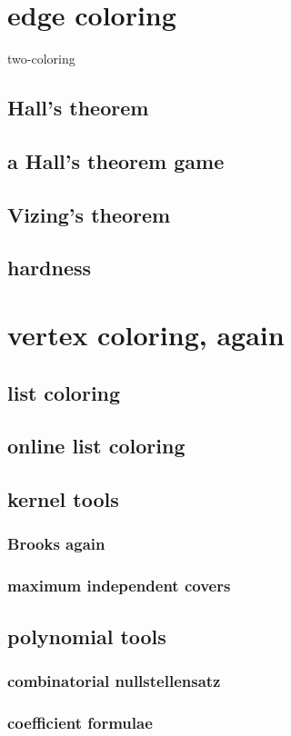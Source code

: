 \documentclass{amsbook}
\theoremstyle{plain}
\numberwithin{equation}{chapter}
\begin{document}
\chapter*{edge coloring}
two-coloring
\section*{Hall's theorem}
\section*{a Hall's theorem game}
\section*{Vizing's theorem}
\section*{hardness}

\chapter*{vertex coloring, again}
\section*{list coloring}
\section*{online list coloring}
\section*{kernel tools}
\subsection*{Brooks again}
\subsection*{maximum independent covers}
\section*{polynomial tools}
\subsection*{combinatorial nullstellensatz}
\subsection*{coefficient formulae}
\end{document}
